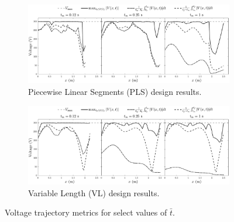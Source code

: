 \begin{figure}[ht]
    \centering
    \begin{subfigure}[b]{\textwidth}
      \centering
      \includegraphics[width=\columnwidth]{../ch7/figures/VoltageStatsPLS.pdf}
      \caption{Piecewise Linear Segments (PLS) design results.}\label{fig:ch7:voltage_stats_pls}
    \end{subfigure}
    \begin{subfigure}[b]{\textwidth}
      \centering
      \includegraphics[width=\columnwidth]{../ch7/figures/VoltageStatsVL.pdf}
      \caption{Variable Length (VL) design results.}\label{fig:ch7:voltage_stats_vl}
    \end{subfigure}
    \caption{Voltage trajectory metrics for select values of $\bar{t}$.\label{fig:ch7:voltage_stats}}
\end{figure}